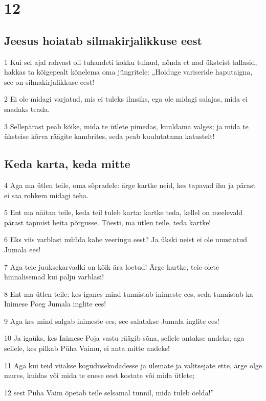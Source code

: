 \chapter{12}

\section*{Jeesus hoiatab silmakirjalikkuse eest}

\par 1 Kui sel ajal rahvast oli tuhandeti kokku tulnud, nõnda et nad üksteist tallasid, hakkas ta kõigepealt kõnelema oma jüngritele: „Hoiduge variseride haputaigna, see on silmakirjalikkuse eest!
\par 2 Ei ole midagi varjatud, mis ei tuleks ilmsiks, ega ole midagi salajas, mida ei saadaks teada.
\par 3 Sellepärast peab kõike, mida te ütlete pimedas, kuuldama valges; ja mida te üksteise kõrva räägite kambrites, seda peab kuulutatama katustelt!

\section*{Keda karta, keda mitte}

\par 4 Aga ma ütlen teile, oma sõpradele: ärge kartke neid, kes tapavad ihu ja pärast ei saa rohkem midagi teha.
\par 5 Ent ma näitan teile, keda teil tuleb karta: kartke teda, kellel on meelevald pärast tapmist heita põrgusse. Tõesti, ma ütlen teile, teda kartke!
\par 6 Eks viis varblast müüda kahe veeringu eest? Ja ükski neist ei ole unustatud Jumala ees!
\par 7 Aga teie juuksekarvadki on kõik ära loetud! Ärge kartke, teie olete hinnalisemad kui palju varblasi!
\par 8 Ent ma ütlen teile: kes iganes mind tunnistab inimeste ees, seda tunnistab ka Inimese Poeg Jumala inglite ees!
\par 9 Aga kes mind salgab inimeste ees, see salatakse Jumala inglite ees!
\par 10 Ja igaüks, kes Inimese Poja vastu räägib sõna, sellele antakse andeks; aga sellele, kes pilkab Püha Vaimu, ei anta mitte andeks!
\par 11 Aga kui teid viiakse kogudusekodadesse ja ülemate ja valitsejate ette, ärge olge mures, kuidas või mida te enese eest kostate või mida ütlete;
\par 12 sest Püha Vaim õpetab teile selsamal tunnil, mida tuleb öelda!”

